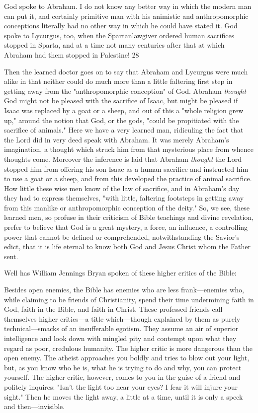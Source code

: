 God spoke to Abraham. I do not know any better way in which the modern man can put it,
and certainly primitive man with his animistic and anthropomorphic conceptions literally had
no other way in which he could have stated it. God spoke to Lycurgus, too, when the Spartanlawgiver ordered human sacrifices stopped in Sparta, and at a time not many centuries after
that at which Abraham had them stopped in Palestine! 28

Then the learned doctor goes on to say that Abraham and Lycurgus were much alike in that
neither could do much more than a little faltering first step in getting away from the
"anthropomorphic conception" of God. Abraham \textit{thought} God might not be pleased with the
sacrifice of Isaac, but might be pleased if Isaac was replaced by a goat or a sheep, and out of
this a "whole religion grew up," around the notion that God, or the gods, "could be
propitiated with the sacrifice of animals." Here we have a very learned man, ridiculing the
fact that the Lord did in very deed speak with Abraham. It was merely Abraham's
imagination, a thought which struck him from that mysterious place from whence thoughts
come. Moreover the inference is laid that Abraham \textit{thought} the Lord stopped him from
offering his son Isaac as a human sacrifice and instructed him to use a goat or a sheep, and
from this developed the practice of animal sacrifice. How little these wise men know of the
law of sacrifice, and in Abraham's day they had to express themselves, "with little, faltering
footsteps in getting away from this manlike or anthropomorphic conception of the deity." So,
we see, these learned men, so profuse in their criticism of Bible teachings and divine
revelation, prefer to believe that God is a great mystery, a force, an influence, a controlling
power that cannot be defined or comprehended, notwithstanding the Savior's edict, that it is
life eternal to know both God and Jesus Christ whom the Father sent.

Well has William Jennings Bryan spoken of these higher critics of the Bible:

Besides open enemies, the Bible has enemies who are less frank—enemies who, while
claiming to be friends of Christianity, spend their time undermining faith in God, faith in the
Bible, and faith in Christ. These professed friends call themselves higher critics—a title
which—though explained by them as purely technical—smacks of an insufferable egotism.
They assume an air of superior intelligence and look down with mingled pity and contempt
upon what they regard as poor, credulous humanity. The higher critic is more dangerous than
the open enemy. The atheist approaches you boldly and tries to blow out your light, but, as
you know who he is, what he is trying to do and why, you can protect yourself. The higher
critic, however, comes to you in the guise of a friend and politely inquires: "Isn't the light too
near your eyes? I fear it will injure your sight." Then he moves the light away, a little at a
time, until it is only a speck and then—invisible.

